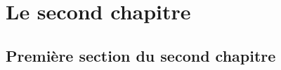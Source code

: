 \chapter{Le second chapitre}\label{chap:C2}
	\setcounter{section}{0}
	\section{Première section du second chapitre}\label{sec:C2_S1}
	\lipsum[0-5]
\newpage